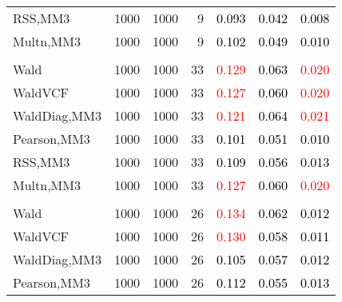 \documentclass[
]{article}
\begin{document}
\begin{table}[H]
{\begin{tabular}[t]{lrrrrrr}
\hspace{1em}RSS,MM3 & 1000 & 1000 & 9 & \textcolor{black}{0.093} & \textcolor{black}{0.042} & \textcolor{black}{0.008}\\
\hspace{1em}Multn,MM3 & 1000 & 1000 & 9 & \textcolor{black}{0.102} & \textcolor{black}{0.049} & \textcolor{black}{0.010}\\
\addlinespace[0.3em]
\multicolumn{7}{l}{\textbf{1F 15V}}\\
\hspace{1em}Wald & 1000 & 1000 & 33 & \textcolor{red}{0.129} & \textcolor{black}{0.063} & \textcolor{red}{0.020}\\
\hspace{1em}WaldVCF & 1000 & 1000 & 33 & \textcolor{red}{0.127} & \textcolor{black}{0.060} & \textcolor{red}{0.020}\\
\hspace{1em}WaldDiag,MM3 & 1000 & 1000 & 33 & \textcolor{red}{0.121} & \textcolor{black}{0.064} & \textcolor{red}{0.021}\\
\hspace{1em}Pearson,MM3 & 1000 & 1000 & 33 & \textcolor{black}{0.101} & \textcolor{black}{0.051} & \textcolor{black}{0.010}\\
\hspace{1em}RSS,MM3 & 1000 & 1000 & 33 & \textcolor{black}{0.109} & \textcolor{black}{0.056} & \textcolor{black}{0.013}\\
\hspace{1em}Multn,MM3 & 1000 & 1000 & 33 & \textcolor{red}{0.127} & \textcolor{black}{0.060} & \textcolor{red}{0.020}\\
\addlinespace[0.3em]
\multicolumn{7}{l}{\textbf{2F 10V}}\\
\hspace{1em}Wald & 1000 & 1000 & 26 & \textcolor{red}{0.134} & \textcolor{black}{0.062} & \textcolor{black}{0.012}\\
\hspace{1em}WaldVCF & 1000 & 1000 & 26 & \textcolor{red}{0.130} & \textcolor{black}{0.058} & \textcolor{black}{0.011}\\
\hspace{1em}WaldDiag,MM3 & 1000 & 1000 & 26 & \textcolor{black}{0.105} & \textcolor{black}{0.057} & \textcolor{black}{0.012}\\
\hspace{1em}Pearson,MM3 & 1000 & 1000 & 26 & \textcolor{black}{0.112} & \textcolor{black}{0.055} & \textcolor{black}{0.013}\\

\end{tabular}}
\end{table}
\end{document}

